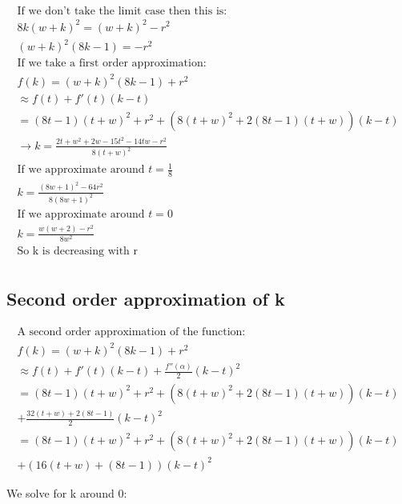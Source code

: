 \documentclass[11pt]{article}
\begin{document}
\begin{align*}
\text{If we don't take the limit case then this is:} \\
8k(w+k)^2= \left( w+k \right)^2 -r^2 \\
(w+k)^2(8k-1)=-r^2 \\
\text{If we take a first order approximation:} \\
f(k)= (w+k)^2(8k-1)+r^2 
\\
\approx f(t)+f'(t)(k-t) \\
=(8 t-1) (t+w)^2+r^2 
+(8 (t+w)^2+2 (8 t-1) (t+w))(k-t) \\
\rightarrow k = \frac{2 t+w^2+2 w-15 t^2-14 t w-r^2}{8 (t+w)^2}
\\
\text{If we approximate around $t=\frac{1}{8}$} \\
k = \frac{(8 w+1)^2-64 r^2}{8 (8 w+1)^2} 
\\
\text{If we approximate around $t=0$} \\
k= \frac{w (w+2)-r^2}{8 w^2}
\\
\text{So k is decreasing with r} \\
\end{align*}

\subsection{Second order approximation of k}
\label{secondorder}

\begin{align*}
\text{A second order approximation of the function:} \\ 
f(k)= (w+k)^2(8k-1)+r^2 \\
\approx f(t)+f'(t)(k-t)+\frac{f''(\alpha)}{2}(k-t)^2 \\
= (8 t-1) (t+w)^2+r^2 
+(8 (t+w)^2+2 (8 t-1) (t+w))(k-t) \\
+\frac{32 (t+w)+2 (8 t-1)}{2}(k-t)^2 \\
= (8 t-1) (t+w)^2+r^2 
+(8 (t+w)^2+2 (8 t-1) (t+w))(k-t) \\
+(16 (t+w)+ (8 t-1))(k-t)^2 
\end{align*}



We solve for k around 0: 
\end{document}
